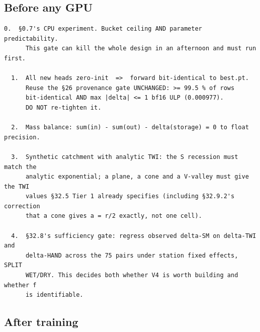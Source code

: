 \documentclass[10pt,a4paper]{article}
\begin{document}
\subsection*{Before any GPU}

\begin{Verbatim}[fontsize=\scriptsize,frame=leftline,framerule=0.6pt,rulecolor=\color{rulegray},xleftmargin=6pt,framesep=6pt,]
  0.  §0.7's CPU experiment. Bucket ceiling AND parameter predictability.
      This gate can kill the whole design in an afternoon and must run first.

  1.  All new heads zero-init  =>  forward bit-identical to best.pt.
      Reuse the §26 provenance gate UNCHANGED: >= 99.5 % of rows
      bit-identical AND max |delta| <= 1 bf16 ULP (0.000977).
      DO NOT re-tighten it.

  2.  Mass balance: sum(in) - sum(out) - delta(storage) = 0 to float precision.

  3.  Synthetic catchment with analytic TWI: the S recession must match the
      analytic exponential; a plane, a cone and a V-valley must give the TWI
      values §32.5 Tier 1 already specifies (including §32.9.2's correction
      that a cone gives a = r/2 exactly, not one cell).

  4.  §32.8's sufficiency gate: regress observed delta-SM on delta-TWI and
      delta-HAND across the 75 pairs under station fixed effects, SPLIT
      WET/DRY. This decides both whether V4 is worth building and whether f
      is identifiable.
\end{Verbatim}

\subsection*{After training}
\end{document}

